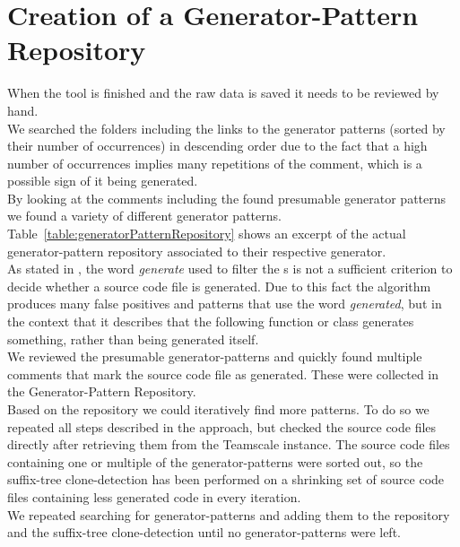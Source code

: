 \section{Creation of a Generator-Pattern Repository}
When the tool is finished and the raw data is saved it needs to be reviewed by hand. \\
We searched the folders including the links to the generator patterns (sorted by their number of occurrences) in descending order due to the fact that a high number of occurrences implies many repetitions of the comment, which is a possible sign of it being generated.\\
By looking at the comments including the found presumable generator patterns we found a variety of different generator patterns. Table~\ref{table:generatorPatternRepository} shows an excerpt of the actual generator-pattern repository associated to their respective generator.\\
As stated in \cite{Bernwieser2014}, the word \textit{generate} used to filter the s is not a sufficient criterion to decide whether a source code file is generated. Due to this fact the algorithm produces many false positives and patterns that use the word \textit{generated}, but in the context that it describes that the following function or class generates something, rather than being generated itself. \\
We reviewed the presumable generator-patterns and quickly found multiple comments that mark the source code file as generated. These were collected in the Generator-Pattern Repository.\\
Based on the repository we could iteratively find more patterns. To do so we repeated all steps described in the approach, but checked the source code files directly after retrieving them from the Teamscale instance. The source code files containing one or multiple of the generator-patterns were sorted out, so the suffix-tree clone-detection has been performed on a shrinking set of source code files containing less generated code in every iteration.\\
We repeated searching for generator-patterns and adding them to the repository and the suffix-tree clone-detection until no generator-patterns were left.












